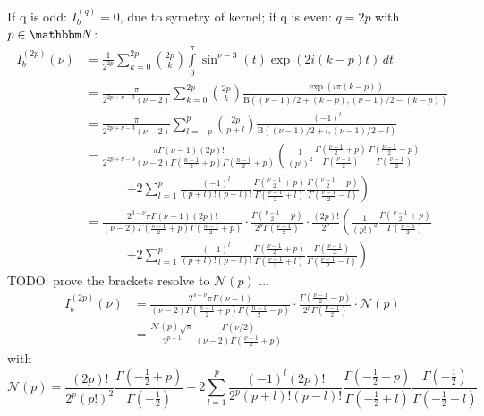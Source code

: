 \documentclass[
  english,		%
  a4paper,		%
  11pt,			%
  DIV=12,		%
  parskip=half  	%
]{scrartcl}
\begin{document}
If q is odd: $I_b^{(q)}=0$, due to symetry of kernel; if q is even: $q=2p$ with $p\in\mathbbm N$:
\begin{align}
I_{b}^{(2p)}(\nu) &= \frac 1 {2^{2p}}\sum\limits_{k=0}^{2p} \binom{2p}{k} \int\limits_0^\pi\sin^{\nu-3}(t)\exp(2i(k-p)t)\,dt\\
 &= \frac \pi{2^{2p+\nu-3} (\nu-2)}\sum\limits_{k=0}^{2p} \binom{2p}{k}\frac{\exp(i\pi(k-p))}{\mathrm{B}((\nu-1)/2+(k-p),(\nu-1)/2-(k-p))}\\
 &= \frac \pi{2^{2p+\nu-3} (\nu-2)}\sum\limits_{l=-p}^{p} \binom{2p}{p+l}\frac{(-1)^l}{\mathrm{B}((\nu-1)/2+l,(\nu-1)/2-l)}\\
 &= \frac {\pi\Gamma(\nu-1)(2p)!}{2^{2p+\nu-3} (\nu-2)\Gamma(\frac{n-1} 2+p)\Gamma(\frac{n-1} 2+p)}\left(\frac 1 {(p!)^2} \frac{\Gamma(\frac{\nu-1} 2+p)}{\Gamma(\frac{\nu-1} 2)}\frac{\Gamma(\frac{\nu-1} 2-p)}{\Gamma(\frac{\nu-1} 2)} \right. \nonumber\\
 &\hspace{40pt}\left. + 2\sum\limits_{l=1}^{p}\frac{(-1)^l}{(p+l)!(p-l)!}\frac{\Gamma(\frac{\nu-1} 2+p)}{\Gamma(\frac{\nu-1} 2+l)}\frac{\Gamma(\frac{\nu-1} 2-p)}{\Gamma(\frac{\nu-1} 2-l)}\right)\\
 &= \frac {2^{3-\nu}\pi\Gamma(\nu-1)(2p)!}{(\nu-2)\Gamma(\frac{n-1} 2+p)\Gamma(\frac{n-1} 2+p)}\cdot \frac{\Gamma(\frac{\nu-1} 2-p)}{2^{p}\Gamma(\frac{\nu-1} 2)} \cdot \frac{(2p)!}{2^p}\left(\frac 1 {(p!)^2} \frac{\Gamma(\frac{\nu-1} 2+p)}{\Gamma(\frac{\nu-1} 2)} \right. \nonumber\\
 &\hspace{40pt}\left. + 2\sum\limits_{l=1}^{p}\frac{(-1)^l}{(p+l)!(p-l)!}\frac{\Gamma(\frac{\nu-1} 2+p)}{\Gamma(\frac{\nu-1} 2+l)}\frac{\Gamma(\frac{\nu-1} 2)}{\Gamma(\frac{\nu-1} 2-l)}\right)
\end{align}
TODO: prove the brackets resolve to $\mathcal N(p)$ ... 
\begin{align}
I_{b}^{(2p)}(\nu) &=\frac {2^{3-\nu}\pi\Gamma(\nu-1)}{(\nu-2)\Gamma(\frac{n-1} 2+p)\Gamma(\frac{n-1} 2-p)} \cdot \frac{\Gamma(\frac{\nu-1} 2-p)}{2^{p}\Gamma(\frac{\nu-1} 2)} \cdot \mathcal{N}(p)\\
 &= \frac{\mathcal{N}(p)\sqrt{\pi}}{2^{p-1}} \frac {\Gamma(\nu/2)} {(\nu-2)\Gamma(\frac{\nu-1}2+p)}
\end{align}
with
\begin{equation}
\mathcal{N}(p) = \frac {(2p)!} {2^{p}(p!)^2}\frac{\Gamma(-\frac{1}2+p)}{\Gamma(-\frac{1}2)} + 2\sum\limits_{l=1}^{p}\frac{(-1)^l(2p)!}{2^p(p+l)!(p-l)!}\frac{\Gamma(-\frac{1} 2+p)}{\Gamma(-\frac{1} 2+l)}\frac{\Gamma(-\frac{1} 2)}{\Gamma(-\frac{1} 2-l)}
\end{equation}
\end{document}
